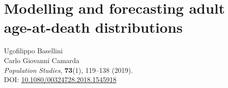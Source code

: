 \documentclass[Thesis]{subfiles}
\begin{document}
\newpage
\chapter{Modelling and forecasting adult age-at-death distributions}\label{Ch3}
\thispagestyle{empty}
\pagecolor{pagecolor}\afterpage{\nopagecolor}
\vspace{1cm}
\Large
Ugofilippo Basellini\\
Carlo Giovanni Camarda
\vspace{2cm}
\textit{\\Population Studies}, \textbf{73}(1), 119--138 (2019).\\
DOI: \href{https://www.tandfonline.com/doi/full/10.1080/00324728.2018.1545918}{\color{black}10.1080/00324728.2018.1545918}
\clearpage

\thispagestyle{empty}
\pagecolor{pagecolor}\afterpage{\nopagecolor}
\section*{}
\clearpage

\end{document}
